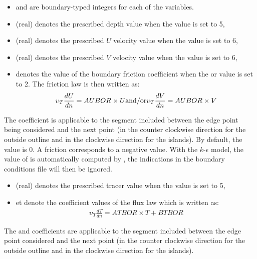 \begin{itemize}
\item  {} and  are boundary-typed
integers for each of the variables.

\item {} (real) denotes the prescribed depth value when the
 value is set to 5,

\item {} (real) denotes the prescribed $U$ velocity value when
the  value is set to 6,

\item {} (real) denotes the prescribed $V$ velocity value when
the  value is set to 6,

\item {} denotes the value of the boundary friction coefficient when
the  or  value is set to 2.
The friction law is then written as:
\begin{align}
\upsilon_{T} \frac{dU}{dn} = AUBOR \times U {\rm and/or }
\upsilon_{T} \frac{dV}{dn} = AUBOR \times V
\end{align}
\end{itemize}
The  coefficient is applicable to the segment included between
the edge point being considered and the next point (in the counter clockwise
direction for the outside outline and in the clockwise direction for the islands).
By default, the  value is 0.
A friction corresponds to a negative value.
With the $k$-$\epsilon$ model, the value of  is automatically
computed by , the indications in the boundary conditions file will
then be ignored.

\begin{itemize}
\item {} (real) denotes the prescribed tracer value when the
 value is set to 5,

\item {} et  denote the coefficient values of the
flux law which is written as:
\begin{align}
\upsilon _{T} \frac{dT}{dn} = ATBOR \times T + BTBOR
\end{align}
\end{itemize}
The  and  coefficients are applicable to the
segment included between the edge point considered and the next point
(in the counter clockwise direction for the outside outline and in the
clockwise direction for the islands).

